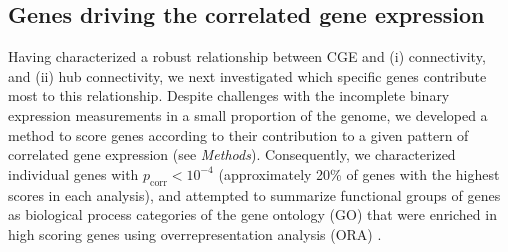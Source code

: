 \documentclass[10pt,letterpaper]{article}
\begin{document}
{\subsection*{Genes driving the correlated gene expression}
Having characterized a robust relationship between CGE and (i) connectivity, and (ii) hub connectivity, we next investigated which specific genes contribute most to this relationship.
Despite challenges with the incomplete binary expression measurements in a small proportion of the genome, we developed a method to score genes according to their contribution to a given pattern of correlated gene expression (see \emph{Methods}).
Consequently, we characterized individual genes with $p_\mathrm{corr} < 10^{-4}$ (approximately 20\% of genes with the highest scores in each analysis), and attempted to summarize functional groups of genes as biological process categories of the gene ontology (GO) that were enriched in high scoring genes using overrepresentation analysis (ORA) \cite{Ashburner2000, Gillis2010}.

}
\end{document}
